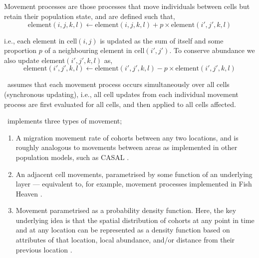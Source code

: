 \subsection{\label{sec:movement-processes}}

Movement processes are those processes that move individuals between cells but retain their population state, and are defined such that,
\begin{equation}
\text{element}(i,j,k,l)\leftarrow \text{element}(i,j,k,l) + p \times \text{element}(i',j',k,l)
\end{equation}

i.e., each element in cell$(i,j)$ is updated as the sum of itself and some proportion $p$ of a neighbouring element in cell$(i',j')$. To conserve abundance we also update element$(i',j',k,l)$ as,
\begin{equation}
\text{element}(i',j',k,l)\leftarrow \text{element}(i',j',k,l) - p\times \text{element}(i',j',k,l)
\end{equation}

\SPM\ assumes that each movement process occurs simultaneously over all cells (synchronous updating), i.e., all cell updates from each individual movement process are first evaluated for all cells, and then applied to all cells affected. 

\SPM\ implements three types of movement;
\begin{enumerate}
	\item  A migration movement rate of cohorts between any two locations, and is roughly analogous to movements between areas as implemented in other population models, such as CASAL \citep{1388}.
	\item An adjacent cell movements, parametrised by some function of an underlying layer --- equivalent to, for example, movement processes implemented in Fish Heaven \citep{1136,1135}. 
	\item Movement parametrised as a probability density function. Here, the key underlying idea is that the spatial distribution of cohorts at any point in time and at any location can be represented as a density function based on attributes of that location, local abundance, and/or distance from their previous location \citep{1366,1367}. 
\end{enumerate}

\subsubsection{}


